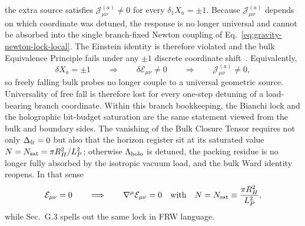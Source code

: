 \documentclass[11pt]{article}
\begin{document}
the extra source satisfies $\mathcal J_{\mu\nu}^{(a)}\neq0$ for every
$\delta_1X_a=\pm1$. Because $\mathcal J_{\mu\nu}^{(a)}$ depends on which
coordinate was detuned, the response is no longer universal and cannot be
absorbed into the single branch-fixed Newton coupling of
Eq.~\eqref{eq:gravity-newton-lock-local}. The Einstein identity is therefore
violated and the bulk Equivalence Principle fails under any $\pm1$ discrete
coordinate shift~\cite{friedan1987,witten1989,gko1985}. Equivalently,
\begin{equation}
 \delta X_a=\pm1
 \qquad\Longrightarrow\qquad
 \delta\mathcal E_{\mu\nu}\neq0
 \qquad\Longrightarrow\qquad
 \mathcal J_{\mu\nu}^{(a)}\neq0,
\end{equation}
so freely falling bulk probes no longer couple to a universal geometric source.
Universality of free fall is therefore lost for every one-step detuning of a
load-bearing branch coordinate.
Within this branch bookkeeping, the Bianchi lock and the holographic bit-budget
saturation are the same statement viewed from the bulk and boundary sides. The
vanishing of the Bulk Closure Tensor requires not only $\Delta_{\rm fr}=0$ but
also that the horizon register sit at its saturated value
$N=N_{\rm sat}=\pi R_H^2/L_P^2$; otherwise $\Lambda_{\rm holo}$ is detuned,
the packing residue is no longer fully absorbed by the isotropic vacuum load,
and the bulk Ward identity reopens. In that sense
\begin{equation}
\label{eq:gravity-bianchi-bit-lock}
 \mathcal E_{\mu\nu}=0
 \qquad\Longrightarrow\qquad
 \nabla^{\mu}\mathcal E_{\mu\nu}=0
 \quad\text{with}\quad
 N=N_{\rm sat}\equiv\frac{\pi R_H^2}{L_P^2},
\end{equation}
while Sec.~G.3 spells out the same lock in FRW language.
\end{document}
